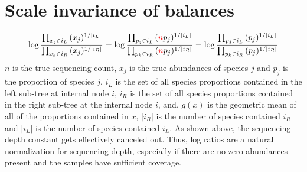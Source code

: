 \section{Scale invariance of balances}
\begin{align}
\log \frac{\prod_{x_j \in i_L}{(x_j)^{1/|i_L|}}}{\prod_{x_k \in i_R}{(x_j)^{1/|i_R|}}} =
\log \frac{\prod_{p_j \in i_L}{(\textcolor{red}{n}p_j)^{1/|i_L|}}}{\prod_{p_k \in i_R}{(\textcolor{red}{n}p_j)^{1/|i_R|}}}=
\log \frac{\prod_{p_j \in i_L}{(p_j)^{1/|i_L|}}}{\prod_{p_k \in i_R}{(p_j)^{1/|i_R|}}}
\end{align}
$n$  is the true sequencing count, $x_j$ is the true abundances of species $j$ and $p_j$ is the proportion of species $j$. $i_L$ is the set of all species proportions contained in the left sub-tree at internal node $i$, $i_R$ is the set of all species proportions contained in the right sub-tree at the internal node $i$, and, $g(x)$ is the geometric mean of all of the proportions contained in $x$, $|i_R|$ is the number of species contained  $i_R$ and  $|i_L|$ is the number of species contained  $i_L$.  As shown above, the sequencing depth constant gets effectively canceled out.  Thus, log ratios are a natural normalization for sequencing depth, especially if there are no zero abundances present and the samples have sufficient coverage.\\[5 mm]
%

